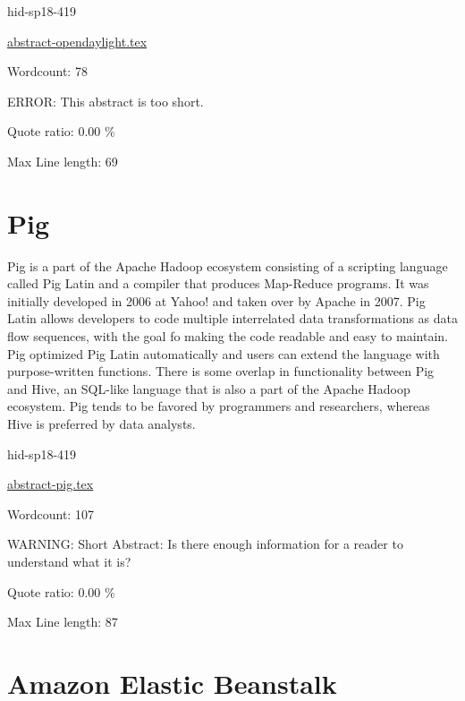 \begin{IU}

hid-sp18-419

\href{https://github.com/cloudmesh-community/hid-sp18-419/blob/master//technology/abstract-opendaylight.tex}{abstract-opendaylight.tex}

 

Wordcount: 78

ERROR: This abstract is too short.


Quote ratio: 0.00 \%
 
Max Line length: 69
\end{IU}

\section{Pig}

Pig is a part of the Apache Hadoop ecosystem consisting of a scripting
language called Pig Latin and a compiler that produces Map-Reduce
programs. It was initially developed in 2006 at Yahoo! and taken over
by Apache in 2007\cite{hid-sp18-419-die2015datascience}. Pig Latin
allows developers to code multiple interrelated data transformations
as data flow sequences, with the goal fo making the code readable and
easy to maintain. Pig optimized Pig Latin automatically and users can
extend the language with purpose-written
functions\cite{hid-sp18-419-www-pig}. There is some overlap in
functionality between Pig and Hive, an SQL-like language that is also
a part of the Apache Hadoop ecosystem. Pig tends to be favored by
programmers and researchers, whereas Hive is preferred by data
analysts\cite{hid-sp18-419-www-dezyre-pig}.


\begin{IU}

hid-sp18-419

\href{https://github.com/cloudmesh-community/hid-sp18-419/blob/master//technology/abstract-pig.tex}{abstract-pig.tex}

 

Wordcount: 107

WARNING: Short Abstract: Is there enough information for a reader to understand what it is?


Quote ratio: 0.00 \%
 
Max Line length: 87
\end{IU}

\section{Amazon Elastic Beanstalk}

